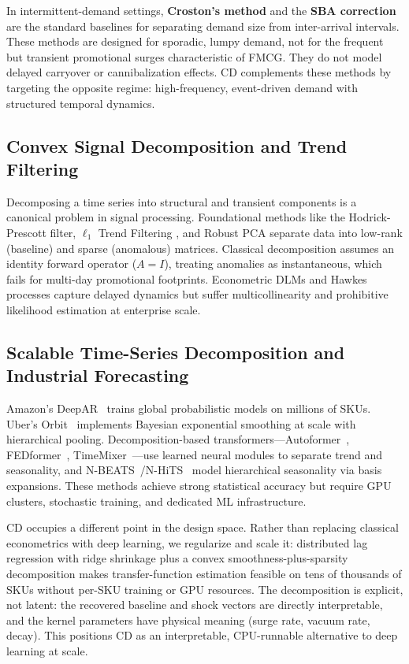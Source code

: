 \documentclass[10pt]{article} %
\theoremstyle{plain}
\theoremstyle{definition}
\begin{document}
In intermittent-demand settings, \textbf{Croston's method} \citep{croston1972forecasting} and the \textbf{SBA correction} \citep{syntetos2005categorization} are the standard baselines for separating demand size from inter-arrival intervals. These methods are designed for sporadic, lumpy demand, not for the frequent but transient promotional surges characteristic of FMCG. They do not model delayed carryover or cannibalization effects. CD complements these methods by targeting the opposite regime: high-frequency, event-driven demand with structured temporal dynamics.

\subsection{Convex Signal Decomposition and Trend Filtering}

Decomposing a time series into structural and transient components is a canonical problem in signal processing. Foundational methods like the Hodrick-Prescott filter, $\ell_1$ Trend Filtering \citep{kim2009ell1,tibshirani2014adaptive}, and Robust PCA \citep{candes2011robust,chandrasekaran2011rank} separate data into low-rank (baseline) and sparse (anomalous) matrices. Classical decomposition assumes an identity forward operator ($A = I$), treating anomalies as instantaneous, which fails for multi-day promotional footprints. Econometric DLMs and Hawkes processes capture delayed dynamics but suffer multicollinearity and prohibitive likelihood estimation at enterprise scale.


\subsection{Scalable Time-Series Decomposition and Industrial Forecasting}

Amazon's DeepAR~\citep{salinas2020deepar} trains global probabilistic models on millions of SKUs. Uber's Orbit~\citep{ng2020orbit} implements Bayesian exponential smoothing at scale with hierarchical pooling. Decomposition-based transformers---Autoformer~\citep{wu2021autoformer}, FEDformer~\citep{zhou2022fedformer}, TimeMixer~\citep{wang2024timemixer}---use learned neural modules to separate trend and seasonality, and N-BEATS~/N-HiTS~\citep{oreshkin2019nbeats,challu2023nhits} model hierarchical seasonality via basis expansions. These methods achieve strong statistical accuracy but require GPU clusters, stochastic training, and dedicated ML infrastructure.

CD occupies a different point in the design space. Rather than replacing classical econometrics with deep learning, we regularize and scale it: distributed lag regression with ridge shrinkage plus a convex smoothness-plus-sparsity decomposition makes transfer-function estimation feasible on tens of thousands of SKUs without per-SKU training or GPU resources. The decomposition is explicit, not latent: the recovered baseline and shock vectors are directly interpretable, and the kernel parameters have physical meaning (surge rate, vacuum rate, decay). This positions CD as an interpretable, CPU-runnable alternative to deep learning at scale.
\end{document}
